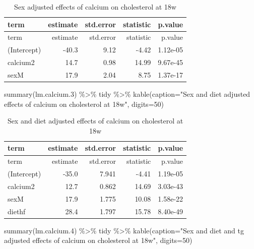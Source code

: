 \documentclass[
]{article}
\newenvironment{Shaded}{\begin{snugshade}}{\end{snugshade}}
\newcommand{\AttributeTok}[1]{\textcolor[rgb]{0.77,0.63,0.00}{#1}}
\newcommand{\DecValTok}[1]{\textcolor[rgb]{0.00,0.00,0.81}{#1}}
\newcommand{\FloatTok}[1]{\textcolor[rgb]{0.00,0.00,0.81}{#1}}
\newcommand{\FunctionTok}[1]{\textcolor[rgb]{0.00,0.00,0.00}{#1}}
\newcommand{\NormalTok}[1]{#1}
\newcommand{\SpecialCharTok}[1]{\textcolor[rgb]{0.00,0.00,0.00}{#1}}
\newcommand{\StringTok}[1]{\textcolor[rgb]{0.31,0.60,0.02}{#1}}
\begin{document}
\begin{longtable}[]{@{}lrrrr@{}}
\caption{Sex adjusted effects of calcium on cholesterol at
18w}\tabularnewline
\toprule()
term & estimate & std.error & statistic & p.value \\
\midrule()
\endfirsthead
\toprule()
term & estimate & std.error & statistic & p.value \\
\midrule()
\endhead
(Intercept) & -40.3 & 9.12 & -4.42 & 1.12e-05 \\
calcium2 & 14.7 & 0.98 & 14.99 & 9.67e-45 \\
sexM & 17.9 & 2.04 & 8.75 & 1.37e-17 \\
\bottomrule()
\end{longtable}

\begin{Shaded}
\begin{Highlighting}[]
\FunctionTok{summary}\NormalTok{(lm.calcium}\FloatTok{.3}\NormalTok{) }\SpecialCharTok{\%\textgreater{}\%}\NormalTok{ tidy }\SpecialCharTok{\%\textgreater{}\%} \FunctionTok{kable}\NormalTok{(}\AttributeTok{caption=}\StringTok{"Sex and diet adjusted effects of calcium on cholesterol at 18w"}\NormalTok{, }\AttributeTok{digits=}\DecValTok{50}\NormalTok{)}
\end{Highlighting}
\end{Shaded}

\begin{longtable}[]{@{}lrrrr@{}}
\caption{Sex and diet adjusted effects of calcium on cholesterol at
18w}\tabularnewline
\toprule()
term & estimate & std.error & statistic & p.value \\
\midrule()
\endfirsthead
\toprule()
term & estimate & std.error & statistic & p.value \\
\midrule()
\endhead
(Intercept) & -35.0 & 7.941 & -4.41 & 1.19e-05 \\
calcium2 & 12.7 & 0.862 & 14.69 & 3.03e-43 \\
sexM & 17.9 & 1.775 & 10.08 & 1.58e-22 \\
diethf & 28.4 & 1.797 & 15.78 & 8.40e-49 \\
\bottomrule()
\end{longtable}

\begin{Shaded}
\begin{Highlighting}[]
\FunctionTok{summary}\NormalTok{(lm.calcium}\FloatTok{.4}\NormalTok{) }\SpecialCharTok{\%\textgreater{}\%}\NormalTok{ tidy }\SpecialCharTok{\%\textgreater{}\%} \FunctionTok{kable}\NormalTok{(}\AttributeTok{caption=}\StringTok{"Sex and diet and tg adjusted effects of calcium on cholesterol at 18w"}\NormalTok{, }\AttributeTok{digits=}\DecValTok{50}\NormalTok{)}
\end{Highlighting}
\end{Shaded}
\end{document}
